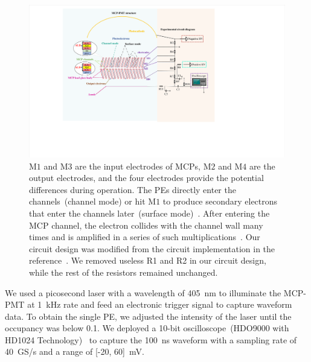 \begin{figure}[!ht]
	\centering
	\includegraphics[width=\linewidth]{PMTRelated/GTmodel/set.pdf}
	\caption{
		$\mathrm{M}1$ and $\mathrm{M}3$ are the input electrodes of MCPs, $\mathrm{M}2$ and $\mathrm{M}4$ are the output electrodes,
		and the four electrodes provide the potential differences during operation.
		The PEs directly enter the channels~(channel mode) or hit $\mathrm{M}1$ to produce secondary electrons
		that enter the channels later~(surface mode)~\cite{2016Optimization}. After entering the MCP channel, the electron collides
		with the channel wall many times and is amplified in a series of such multiplications~\cite{1955Scintillation}.
		Our circuit design was modified from the circuit implementation in the reference~\cite{Luo:2023jdf}.
		We removed useless R1 and R2 in our circuit design, while the rest of the resistors remained unchanged.}
	\label{fig:circuit}
\end{figure}

We used a picosecond laser with a wavelength of \SI{405}{nm} to illuminate the MCP-PMT at \SI{1}{kHz} rate and feed an electronic trigger signal to capture waveform data.
To obtain the single PE, we adjusted the intensity of the laser until the occupancy was below 0.1.
We deployed a 10-bit oscilloscope~(HDO9000 with HD1024 Technology)~\cite{teledynelecroy} to capture the \SI{100}{ns} waveform
with a sampling rate of \SI{40}{GS/s} and a range of [-20, 60]~\si{mV}.


